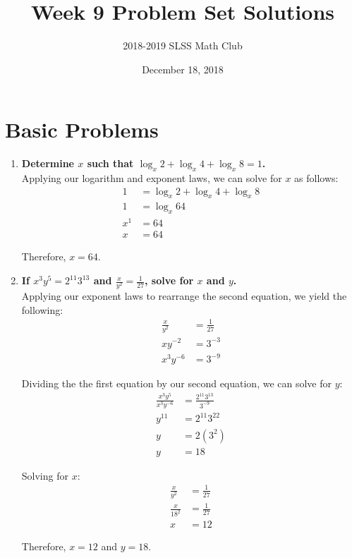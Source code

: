 \documentclass[12pt]{article}
\title{Week 9 Problem Set Solutions \vspace{-3mm}}
\author{2018-2019 SLSS Math Club\vspace{-5mm}}
\date{December 18, 2018\vspace{-5mm}}
\begin{document}
\maketitle

\section*{Basic Problems}
\begin{enumerate}
    \item \textbf{Determine $x$ such that $\log_x2 + \log_x4 + \log_x8 = 1$.} \\
    
    Applying our logarithm and exponent laws, we can solve for $x$ as follows:
    \begin{align*}
        1 &= \log_x2 + \log_x4 + \log_x8 \\
        1 &= \log_x64 \\
        x^1 &= 64 \\
        x &= 64
    \end{align*}
    
    Therefore, $x = 64$.
    
    \item \textbf{If $\displaystyle{x^3y^5 = 2^{11}  3^{13}}$ and $\displaystyle{\frac{x}{y^2} = \frac{1}{27}}$, solve for $x$ and $y$.} \\
    
    Applying our exponent laws to rearrange the second equation, we yield the following:
    \begin{align*}
        \frac{x}{y^2} &= \frac{1}{27} \\
        xy^{-2} &= 3^{-3} \\
        x^3 y^{-6} &= 3^{-9} 
    \end{align*}
    
    Dividing the the first equation by our second equation, we can solve for $y$:
    \begin{align*}
        \frac{x^3y^5}{x^3y^{-6}} &= \frac{2^{11}3^{13}}{3^{-9}} \\
        y^{11} &= 2^{11} 3^{22} \\
        y &= 2(3^2) \\
        y &= 18
    \end{align*}
    
    Solving for $x$:
    \begin{align*}
        \frac{x}{y^2} &= \frac{1}{27} \\
        \frac{x}{18^2} &= \frac{1}{27} \\
        x &= 12
    \end{align*}
    
    Therefore, $x = 12$ and $y = 18$.
    
\end{enumerate} \newpage
\end{document}

